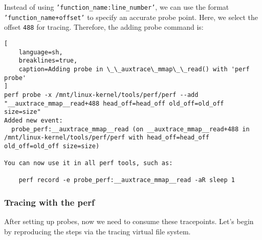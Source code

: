 \documentclass[11pt]{diazessay} %
\def\code#1{\texttt{#1}}
\begin{document}
Instead of using \code{'function\_name:line\_number'}, we can use the format
\code{'function\_name+offset'} to specify an accurate probe point. Here,
we select the offset \code{488} for tracing. Therefore, the adding probe
command is:

\begin{lstlisting}[
  	language=sh,
	breaklines=true,
	caption=Adding probe in \_\_auxtrace\_mmap\_\_read() with 'perf probe'
]
perf probe -x /mnt/linux-kernel/tools/perf/perf --add "__auxtrace_mmap__read+488 head_off=head_off old_off=old_off size=size"
Added new event:
  probe_perf:__auxtrace_mmap__read (on __auxtrace_mmap__read+488 in /mnt/linux-kernel/tools/perf/perf with head_off=head_off old_off=old_off size=size)

You can now use it in all perf tools, such as:

	perf record -e probe_perf:__auxtrace_mmap__read -aR sleep 1
\end{lstlisting}

\subsubsection*{Tracing with the perf}

After setting up probes, now we need to consume these tracepoints. Let's begin
by reproducing the steps via the tracing virtual file system.
\end{document}
